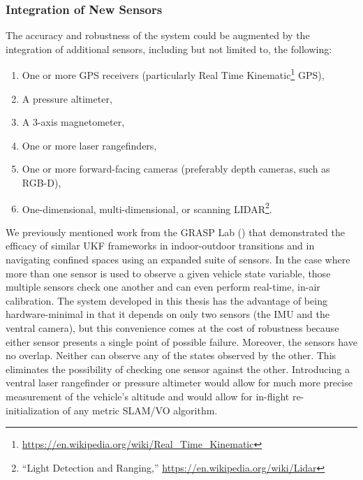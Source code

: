 \subsubsection{Integration of New Sensors}
The accuracy and robustness of the system could be augmented by the integration of additional sensors, including but not limited to, the following:
\begin{enumerate}
    \item One or more GPS receivers (particularly Real Time Kinematic\footnote{\url{https://en.wikipedia.org/wiki/Real_Time_Kinematic}} GPS),
    \item A pressure altimeter,
    \item A 3-axis magnetometer,
    \item One or more laser rangefinders,
    \item One or more forward-facing cameras (preferably depth cameras, such as RGB-D),
    \item One-dimensional, multi-dimensional, or scanning LIDAR\footnote{``Light Detection and Ranging,'' \url{https://en.wikipedia.org/wiki/Lidar}}.
\end{enumerate}

We previously mentioned work from the GRASP Lab (\cite{Shen2011}) that demonstrated the efficacy of similar UKF frameworks in indoor-outdoor transitions and in navigating confined spaces using an expanded suite of sensors. In the case where more than one sensor is used to observe a given vehicle state variable, those multiple sensors check one another and can even perform real-time, in-air calibration. The system developed in this thesis has the advantage of being hardware-minimal in that it depends on only two sensors (the IMU and the ventral camera), but this convenience comes at the cost of robustness because either sensor presents a single point of possible failure. Moreover, the sensors have no overlap. Neither can observe any of the states observed by the other. This eliminates the possibility of checking one sensor against the other. Introducing a ventral laser rangefinder or pressure altimeter would allow for much more precise measurement of the vehicle's altitude and would allow for in-flight re-initialization of any metric SLAM/VO algorithm.

